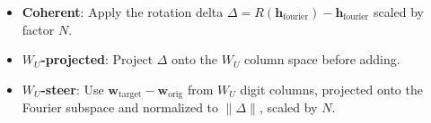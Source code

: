 \begin{itemize}
    \item \textbf{Coherent}: Apply the rotation delta $\Delta = R(\mathbf{h}_\text{fourier}) - \mathbf{h}_\text{fourier}$ scaled by factor $N$.
    \item \textbf{$W_U$-projected}: Project $\Delta$ onto the $W_U$ column space before adding.
    \item \textbf{$W_U$-steer}: Use $\mathbf{w}_\text{target} - \mathbf{w}_\text{orig}$ from $W_U$ digit columns, projected onto the Fourier subspace and normalized to $\|\Delta\|$, scaled by $N$.
\end{itemize}
